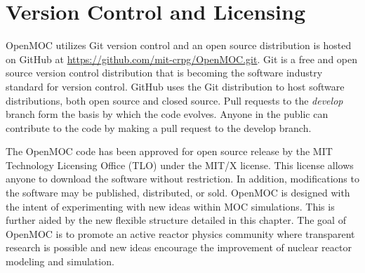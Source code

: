 \section{Version Control and Licensing}
\label{sec:version-control}

OpenMOC utilizes Git version control and an open source distribution is hosted on GitHub at \url{https://github.com/mit-crpg/OpenMOC.git}. Git is a free and open source version control distribution that is becoming the software industry standard for version control. GitHub uses the Git distribution to host software distributions, both open source and closed source. Pull requests to the \textit{develop} branch form the basis by which the code evolves. Anyone in the public can contribute to the code by making a pull request to the develop branch. 

The OpenMOC code has been approved for open source release by the MIT Technology Licensing Office (TLO) under the MIT/X license. This license allows anyone to download the software without restriction. In addition, modifications to the software may be published, distributed, or sold. OpenMOC is designed with the intent of experimenting with new ideas within MOC simulations. This is further aided by the new flexible structure detailed in this chapter. The goal of OpenMOC is to promote an active reactor physics community where transparent research is possible and new ideas encourage the improvement of nuclear reactor modeling and simulation.
